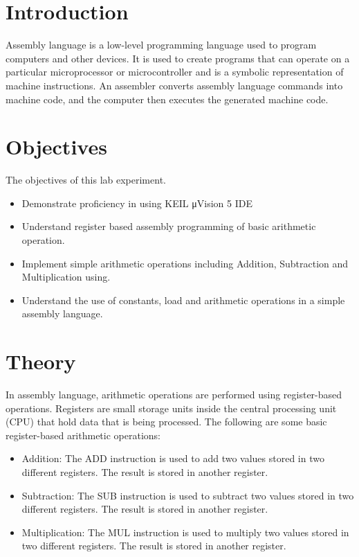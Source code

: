 \documentclass[11pt]{article}
\begin{document}
\section{Introduction}
Assembly language is a low-level programming language used to program computers and other devices. It is used to create programs that can operate on a particular microprocessor or microcontroller and is a symbolic representation of machine instructions. An assembler converts assembly language commands into machine code, and the computer then executes the generated machine code.

\section{Objectives}
The objectives of this lab experiment.
\begin{itemize}
    \item Demonstrate proficiency in using KEIL μVision 5 IDE

    \item Understand register based assembly programming of basic arithmetic operation. 

    \item Implement simple arithmetic operations including Addition, Subtraction and Multiplication using.

    \item Understand the use of constants, load and arithmetic operations in a simple assembly language.
\end{itemize}
\section{Theory}
In assembly language, arithmetic operations are performed using register-based operations. Registers are small storage units inside the central processing unit (CPU) that hold data that is being processed. The following are some basic register-based arithmetic operations:
\begin{itemize}
    \item Addition: The ADD instruction is used to add two values stored in two different registers. The result is stored in another register.

    \item Subtraction: The SUB instruction is used to subtract two values stored in two different registers. The result is stored in another register.

    \item Multiplication: The MUL instruction is used to multiply two values stored in two different registers. The result is stored in another register.
\end{itemize}
\end{document}
